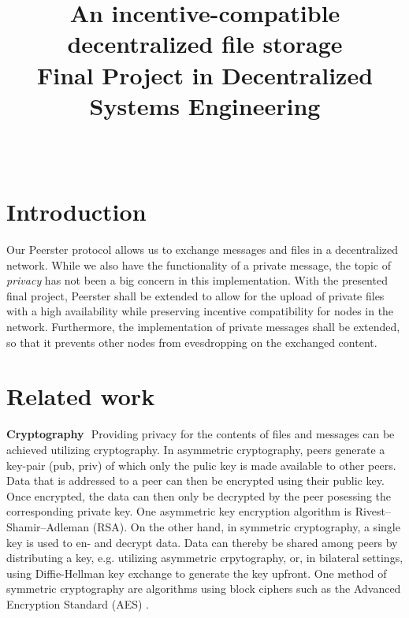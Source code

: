 \documentclass{article}
\title{
\vspace{-10mm}\fontsize{19pt}{10pt}\selectfont
\textbf{An incentive-compatible decentralized file storage}\\
\vspace{0.5em}\fontsize{12pt}{10pt}\selectfont
\textbf{Final Project in Decentralized Systems Engineering}\\
\vspace{0.7em}\fontsize{12pt}{10pt}\selectfont
\text{Carolin Beer, SCIPER Nr. 294852}\\
\vspace{-4ex}
}
\author{}
\date{}
\begin{document}

\maketitle %
\thispagestyle{fancy} %
\newcommand{\elem}[1]{\noindent\textbf{#1}\,\,}
\section*{Introduction}
Our Peerster protocol allows us to exchange messages and files in a decentralized network. While we also have the functionality of a private message, the topic of \emph{privacy} has not been a big concern in this implementation. 
With the presented final project, Peerster shall be extended to allow for the upload of private files with a high availability while preserving incentive compatibility for nodes in the network. Furthermore, the implementation of private messages shall be extended, so that it prevents other nodes from evesdropping on the exchanged content.

\section*{Related work}
\elem{Cryptography}
Providing privacy for the contents of files and messages can be achieved utilizing cryptography. In asymmetric cryptography, peers generate a key-pair (pub, priv) of which only the pulic key is made available to other peers. Data that is addressed to a peer can then be encrypted using their public key. Once encrypted, the data can then only be decrypted by the peer posessing the corresponding private key. One asymmetric key encryption algorithm is Rivest–Shamir–Adleman (RSA).
On the other hand, in symmetric cryptography, a single key is used to en- and decrypt data. Data can thereby be shared among peers by distributing a key, e.g. utilizing asymmetric crpytography, or, in bilateral settings, using Diffie-Hellman key exchange to generate the key upfront. One method of symmetric cryptography are algorithms using block ciphers such as the Advanced Encryption Standard (AES) \citep{Smart.2002}.
\\\vspace{0.5em}
\end{document}
